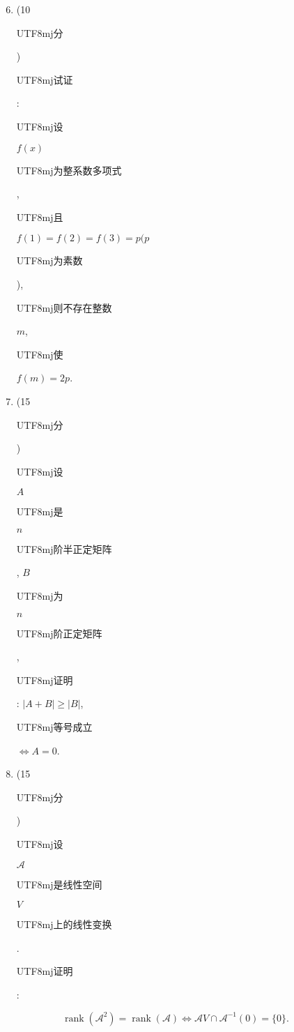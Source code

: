 \documentclass[10pt]{article}
\begin{document}
\begin{enumerate}
  \setcounter{enumi}{5}
  \item (10 \begin{CJK}{UTF8}{mj}分\end{CJK}) \begin{CJK}{UTF8}{mj}试证\end{CJK}: \begin{CJK}{UTF8}{mj}设\end{CJK} $f(x)$ \begin{CJK}{UTF8}{mj}为整系数多项式\end{CJK}, \begin{CJK}{UTF8}{mj}且\end{CJK} $f(1)=f(2)=f(3)=p(p$ \begin{CJK}{UTF8}{mj}为素数\end{CJK}), \begin{CJK}{UTF8}{mj}则不存在整数\end{CJK} $m$, \begin{CJK}{UTF8}{mj}使\end{CJK} $f(m)=2 p$.

  \item (15 \begin{CJK}{UTF8}{mj}分\end{CJK}) \begin{CJK}{UTF8}{mj}设\end{CJK} $A$ \begin{CJK}{UTF8}{mj}是\end{CJK} $n$ \begin{CJK}{UTF8}{mj}阶半正定矩阵\end{CJK}, $B$ \begin{CJK}{UTF8}{mj}为\end{CJK} $n$ \begin{CJK}{UTF8}{mj}阶正定矩阵\end{CJK}, \begin{CJK}{UTF8}{mj}证明\end{CJK}: $|A+B| \geqslant|B|$, \begin{CJK}{UTF8}{mj}等号成立\end{CJK} $\Leftrightarrow A=0$.

  \item (15 \begin{CJK}{UTF8}{mj}分\end{CJK}) \begin{CJK}{UTF8}{mj}设\end{CJK} $\mathscr{A}$ \begin{CJK}{UTF8}{mj}是线性空间\end{CJK} $V$ \begin{CJK}{UTF8}{mj}上的线性变换\end{CJK}. \begin{CJK}{UTF8}{mj}证明\end{CJK}:

\end{enumerate}
$$
\operatorname{rank}\left(\mathscr{A}^{2}\right)=\operatorname{rank}(\mathscr{A}) \Leftrightarrow \mathscr{A} V \cap \mathscr{A}^{-1}(0)=\{0\} .
$$
\end{document}
